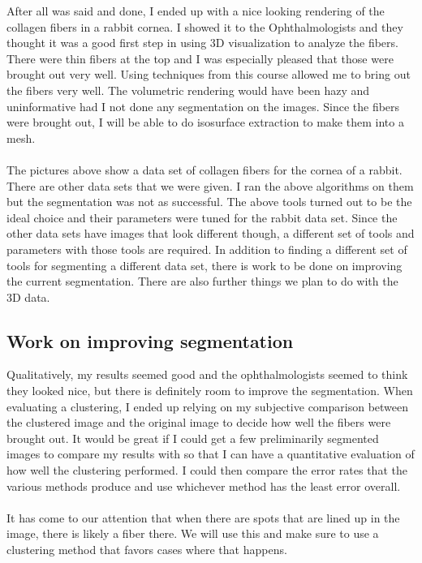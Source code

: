 \documentclass[11pt,psfig]{article}
\begin{document}
After all was said and done, I ended up with a nice looking rendering of the collagen fibers in a rabbit cornea. I showed it to the Ophthalmologists and they thought it was a good first step in using 3D visualization to analyze the fibers. There were thin fibers at the top and I was especially pleased that those were brought out very well. Using techniques from this course allowed me to bring out the fibers very well. The volumetric rendering would have been hazy and uninformative had I not done any segmentation on the images. Since the fibers were brought out, I will be able to do isosurface extraction to make them into a mesh. \\
\\
The pictures above show a data set of collagen fibers for the cornea of a rabbit. There are other data sets that we were given. I ran the above algorithms on them but the segmentation was not as successful. The above tools turned out to be the ideal choice and their parameters were tuned for the rabbit data set. Since the other data sets have images that look different though, a different set of tools and parameters with those tools are required. In addition to finding a different set of tools for segmenting a different data set, there is work to be done on improving the current segmentation. There are also further things we plan to do with the 3D data. 

\subsection*{Work on improving segmentation}

Qualitatively, my results seemed good and the ophthalmologists seemed to think they looked nice, but there is definitely room to improve the segmentation. When evaluating a clustering, I ended up relying on my subjective comparison between the clustered image and the original image to decide how well the fibers were brought out. It would be great if I could get a few preliminarily segmented images to compare my results with so that I can have a quantitative evaluation of how well the clustering performed. I could then compare the error rates that the various methods produce and use whichever method has the least error overall. \\
\\
It has come to our attention that when there are spots that are lined up in the image, there is likely a fiber there. We will use this and make sure to use a clustering method that favors cases where that happens. 
\\
\end{document}

